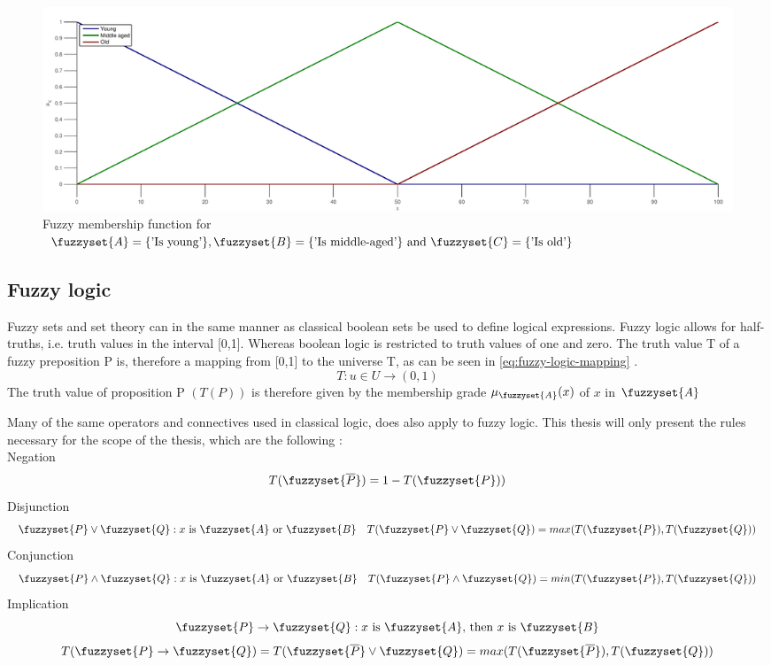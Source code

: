 \begin{figure}
    \centering
    \includegraphics[width=\textwidth]{FMF_ex2}
    \caption{Fuzzy membership function for $\protect\fuzzyset{A}=\{\text{'Is young'}\}, \protect\fuzzyset{B}=\{\text{'Is middle-aged'\}}\text{ and }\protect\fuzzyset{C}=\{\text{'Is old'}\}$}
    \label{fig:FMF_ex2}
\end{figure}
\subsection{Fuzzy logic}
Fuzzy sets and set theory can in the same manner as classical boolean sets be used to define logical expressions. Fuzzy logic allows for half-truths, i.e. truth values in the interval [0,1]. Whereas boolean logic is restricted to truth values of one and zero. The truth value T of a fuzzy preposition P is, therefore a mapping from [0,1] to the universe T, as can be seen in \ref{eq:fuzzy-logic-mapping} \cite{ross2009fuzzy}.
\begin{equation}
    T:u\in U\rightarrow (0,1)
    \label{eq:fuzzy-logic-mapping}
\end{equation}
The truth value of proposition P $(T(P))$ is therefore given by the membership grade $\mu_{\fuzzyset{A}}(x)$ of $x$ in $\fuzzyset{A}$

Many of the same operators and connectives used in classical logic, does also apply to fuzzy logic. This thesis will only present the rules necessary for the scope of the thesis, which are the following \cite{ross2009fuzzy}:\\
\noindent Negation
\begin{equation}
    T(\fuzzyset{\overline{P}})=1-T(\fuzzyset{P})) {}\label{eq:negation}
\end{equation}
Disjunction
\begin{equation}
    \fuzzyset{P}\lor \fuzzyset{Q}:x \text{ is } \fuzzyset{A} \text{ or } \fuzzyset{B}\quad T(\fuzzyset{P} \lor \fuzzyset{Q})=max(T(\fuzzyset{P}),T(\fuzzyset{Q}))\label{eq:disjunction}
\end{equation}
Conjunction
\begin{equation}
    \fuzzyset{P}\land \fuzzyset{Q}:x \text{ is } \fuzzyset{A} \text{ or } \fuzzyset{B}\quad T(\fuzzyset{P} \land \fuzzyset{Q})=min(T(\fuzzyset{P}),T(\fuzzyset{Q}))\label{eq:conjunction}
\end{equation}
Implication
\begin{equation}
    \fuzzyset{P}\to \fuzzyset{Q}: x \text{ is } \fuzzyset{A} \text{, then }x \text{ is } \fuzzyset{B}
    \label{eq:implication}
\end{equation}
\[ T(\fuzzyset{P}\to \fuzzyset{Q})=T(\fuzzyset{\overline{P}}\lor\fuzzyset{Q})=max(T(\fuzzyset{\overline{P}}),T(\fuzzyset{Q}))  \]

